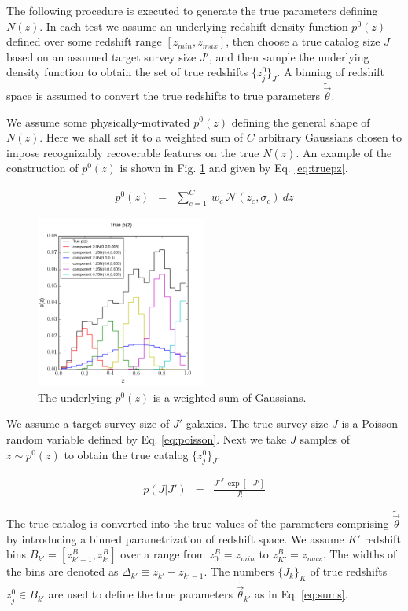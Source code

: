 \documentclass[preprint]{aastex}
\begin{document}
The following procedure is executed to generate the true parameters defining $N(z)$.  In each test we assume an underlying redshift density function $p^{0}(z)$ defined over some redshift range $[z_{min},z_{max}]$, then choose a true catalog size $J$ based on an assumed target survey size $J'$, and then sample the underlying density function to obtain the set of true redshifts $\{z_{j}^{0}\}_{J}$.  A binning of redshift space is assumed to convert the true redshifts to true parameters $\tilde{\vec{\theta}}$.

We assume some physically-motivated $p^{0}(z)$ defining the general shape of $N(z)$.  Here we shall set it to a weighted sum of $C$ arbitrary Gaussians chosen to impose recognizably recoverable features on the true $N(z)$.  An example of the construction of $p^{0}(z)$ is shown in Fig. \ref{fig:physPz} and given by Eq. \ref{eq:truepz}.

\begin{eqnarray}
\label{eq:truepz}
p^{0}(z) &=& \sum_{c=1}^{C}\ w_{c}\ \mathcal{N}(z_{c},\sigma_{c})\ dz
\end{eqnarray}

\begin{figure}
\label{fig:physPz}
\includegraphics[width=0.5\textwidth]{physPz.png}
\caption{The underlying $p^{0}(z)$ is a weighted sum of Gaussians.}
\end{figure}

We assume a target survey size of $J'$ galaxies.  The true survey size $J$ is a Poisson random variable defined by Eq. \ref{eq:poisson}.  Next we take $J$ samples of $z\sim p^{0}(z)$ to obtain the true catalog $\{z_{j}^{0}\}_{J}$.  

\begin{eqnarray}
\label{eq:poisson}
p(J|J') &=& \frac{J'^{J}\ \exp[-J']}{J!}
\end{eqnarray}

The true catalog is converted into the true values of the parameters comprising $\tilde{\vec{\theta}}$ by introducing a binned parametrization of redshift space.  We assume $K'$ redshift bins $B_{k'}=[z^{B}_{k'-1},z^{B}_{k'}]$ over a range from $z^{B}_{0}=z_{min}$ to $z^{B}_{K'}=z_{max}$.  The widths of the bins are denoted as $\Delta_{k'}\equiv z_{k'}-z_{k'-1}$.  The numbers $\{J_{k}\}_{K}$ of true redshifts $z^{0}_{j}\in B_{k'}$ are used to define the true parameters $\tilde{\vec{\theta}}_{k'}$ as in Eq. \ref{eq:sums}.
\end{document}
